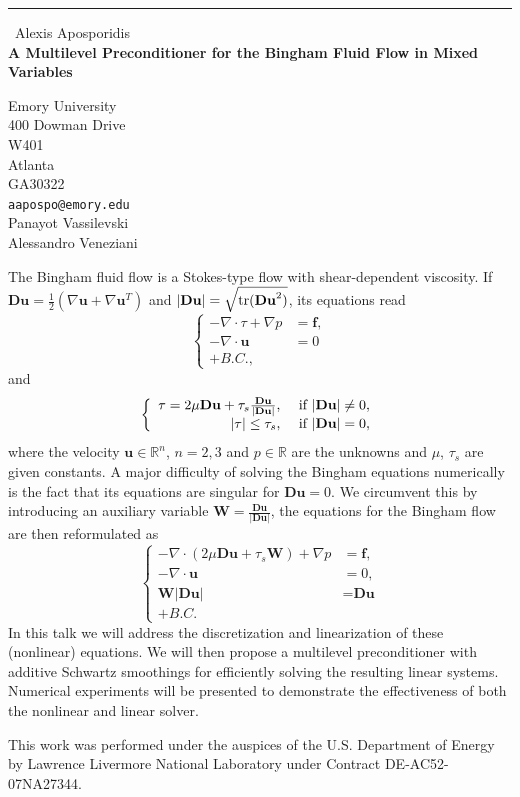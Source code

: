 \documentclass{report}
\begin{document}
\begin{center}
\rule{6in}{1pt} \
{\large Alexis Aposporidis \\
{\bf A Multilevel Preconditioner for the Bingham Fluid Flow in Mixed Variables}}

Emory University \\ 400 Dowman Drive \\ W401 \\ Atlanta \\ GA30322
\\
{\tt aapospo@emory.edu}\\
Panayot Vassilevski\\
Alessandro Veneziani\end{center}

\newcommand{\Du}{\textbf{Du}}
\newcommand{\bu}{\textbf{u}}
\newcommand{\f}{\textbf{f}}
\newcommand{\tr}{\textnormal{tr}}
\newcommand{\bW}{\textbf{W}}

The Bingham fluid flow is a Stokes-type flow with shear-dependent
viscosity. If $\Du=\frac{1}{2}(\nabla \bu + \nabla \bu^T)$ and
$|\Du|=\sqrt{\tr(\Du^2)}$, its equations read
\[ \left\{ \begin{array}{rl} -\nabla \cdot \tau +\nabla p &= \f, \\
-\nabla \cdot \bu &=0 \\ +B.C., \end{array} \right. \]
and
\[ \left\{ \begin{array}{rl} \tau=2\mu \Du+\tau_s \frac{\Du}{|\Du|},
&\textnormal{ if } |\Du| \not=0, \\ |\tau| \leq \tau_s, & \textnormal{ if
} |\Du|=0, \end{array} \right. \]
where the velocity $\bu \in \mathbb{R}^n$, $n=2,3$ and $p \in \mathbb{R}$
are the unknowns and $\mu$, $\tau_s$ are given constants. A major
difficulty of solving the Bingham equations numerically is the fact that
its equations are singular for $\Du = 0$. We circumvent this by
introducing an auxiliary variable $\bW = \frac{\Du}{|\Du|}$, the
equations for the Bingham flow are then reformulated as
\[ \left\{ \begin{array}{rl} -\nabla \cdot \left( 2\mu \Du + \tau_s \bW
\right) +\nabla p &=\f, \\ -\nabla \cdot \bu &=0, \\ \bW |\Du| &=\Du \\
+B.C. \end{array} \right. \]
In this talk we will address the discretization and linearization of
these (nonlinear) equations. We will then propose a multilevel
preconditioner with additive Schwartz smoothings for efficiently solving
the resulting linear systems. Numerical experiments will be presented to
demonstrate the effectiveness of both the nonlinear and linear solver.


This work was performed under the auspices of the U.S. Department of
Energy by Lawrence Livermore National Laboratory under Contract
DE-AC52-07NA27344.
\end{document}
